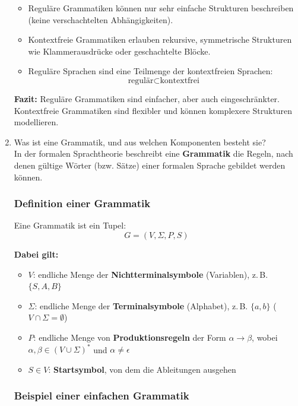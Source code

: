 \documentclass[a4paper,12pt]{article}
\begin{document}
\begin{enumerate}
			\begin{itemize}
				\item Reguläre Grammatiken können nur sehr einfache Strukturen beschreiben (keine verschachtelten Abhängigkeiten).
				\item Kontextfreie Grammatiken erlauben rekursive, symmetrische Strukturen wie Klammerausdrücke oder geschachtelte Blöcke.
				\item Reguläre Sprachen sind eine Teilmenge der kontextfreien Sprachen:
				\[
				\text{regulär} \subset \text{kontextfrei}
				\]
			\end{itemize}
			
			\textbf{Fazit:}  
			Reguläre Grammatiken sind einfacher, aber auch eingeschränkter. Kontextfreie Grammatiken sind flexibler und können komplexere Strukturen modellieren.
			
			
			\item Was ist eine Grammatik, und aus welchen Komponenten besteht sie?\\
			
			In der formalen Sprachtheorie beschreibt eine \textbf{Grammatik} die Regeln, nach denen gültige Wörter (bzw. Sätze) einer formalen Sprache gebildet werden können.
			
			\subsubsection*{Definition einer Grammatik}
			
			Eine Grammatik ist ein Tupel:
			\[
			G = (V, \Sigma, P, S)
			\]
			
			\textbf{Dabei gilt:}
			\begin{itemize}
				\item \( V \): endliche Menge der \textbf{Nichtterminalsymbole} (Variablen), z.\,B. \( \{S, A, B\} \)
				\item \( \Sigma \): endliche Menge der \textbf{Terminalsymbole} (Alphabet), z.\,B. \( \{a, b\} \)  
				(\( V \cap \Sigma = \emptyset \))
				\item \( P \): endliche Menge von \textbf{Produktionsregeln} der Form \( \alpha \rightarrow \beta \), wobei \( \alpha, \beta \in (V \cup \Sigma)^* \) und \( \alpha \neq \epsilon \)
				\item \( S \in V \): \textbf{Startsymbol}, von dem die Ableitungen ausgehen
			\end{itemize}
			
			\subsubsection*{Beispiel einer einfachen Grammatik}
			

\end{enumerate}
\end{document}
